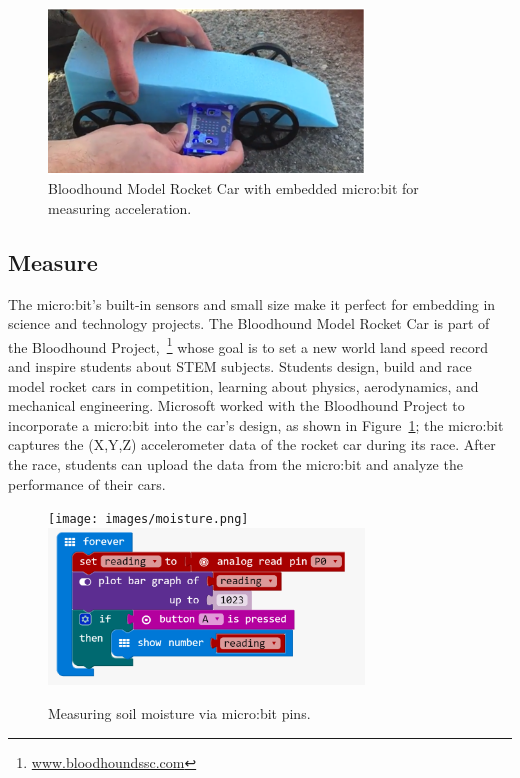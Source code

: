 

\begin{figure} 
    \includegraphics[width=3.3in]{images/rocketcar.png} 
    \caption{\label{fig:rocketcar}Bloodhound Model Rocket Car with embedded micro:bit for
    measuring acceleration.}
\end{figure}

\subsection{Measure}

The micro:bit's built-in sensors and small size make it perfect for embedding
in science and technology projects.  The Bloodhound Model Rocket Car is 
part of the Bloodhound Project,~\footnote{\url{www.bloodhoundssc.com}} 
whose goal is to set a new world land speed
record and inspire students about STEM subjects. 
Students design, build and race model rocket cars in competition, learning about
physics, aerodynamics, and mechanical engineering. Microsoft worked with
the Bloodhound Project to incorporate a micro:bit into the car's design,
as shown in Figure~\ref{fig:rocketcar};
the micro:bit captures the (X,Y,Z) accelerometer data of the rocket car
during its race. After the race, students can upload the data from 
the micro:bit and analyze the performance of their cars. 

%


\begin{figure} 
    \texttt{[image: images/moisture.png]} 
    \includegraphics[width=3.3in]{images/moistureBlocks.png} 
    \caption{\label{fig:moisture}Measuring soil moisture via micro:bit pins.}
\end{figure}

